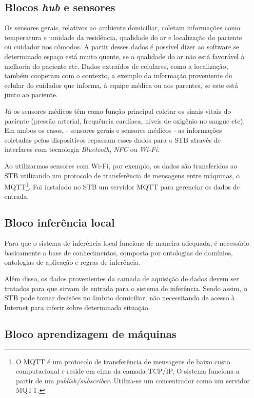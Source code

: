 \subsection{Blocos \textit{hub} e sensores}

Os sensores gerais, relativos ao ambiente domiciliar, coletam
informações como  temperatura e umidade da residência, qualidade do ar e
localização do paciente ou cuidador nos cômodos. A partir desses dados é
possível dizer ao software se determinado espaço está muito quente, se a
qualidade do ar não está favorável à melhoria do paciente etc. Dados extraídos
de celulares, como a localização, também cooperam com o contexto, a exemplo da
informação proveniente do celular do cuidador que informa, à equipe médica ou
aos parentes, se este está junto ao paciente.

Já os sensores médicos têm como função principal coletar os sinais vitais do
paciente (pressão arterial, frequência cardíaca, níveis de oxigênio no sangue
etc). Em ambos os casos, - sensores gerais e sensores médicos - as informações
coletadas pelos dispositivos repassam  esses dados para o STB através de
interfaces com tecnologia  \textit{Bluetooth}, \textit{NFC} ou \textit{Wi-Fi}.

Ao utilizarmos sensores com Wi-Fi, por exemplo, os dados são transferidos ao
STB utilizando um protocolo de transferência de mensagens entre máquinas, o
MQTT\footnote{O MQTT é um protocolo de transferência de mensagens de baixo
custo computacional e reside em cima da camada TCP/IP. O sistema funciona a
partir de um \textit{publish/subscriber}. Utiliza-se um concentrador como um
servidor MQTT.}.  Foi instalado no STB um servidor MQTT para gerenciar os dados
de entrada.

\subsection{Bloco inferência local}

Para que o sistema de inferência local funcione de maneira adequada, é
necessário basicamente a base de conhecimentos, composta por ontologias de
domínios, ontologias de aplicação e regras de inferência. 

Além disso, os dados provenientes da camada de aquisição de dados devem ser
tratados para que sirvam de entrada para o sistema de inferência. Sendo assim,
o STB pode tomar decisões no âmbito domiciliar, não necessitando de acesso
à Internet para inferir sobre determinada situação.

\subsection{Bloco aprendizagem de máquinas}

